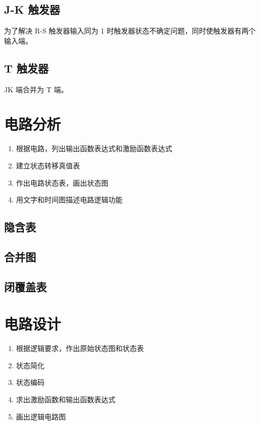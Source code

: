 \subsection{J-K 触发器}

为了解决 R-S 触发器输入同为 1 时触发器状态不确定问题，同时使触发器有两个输入端。

\subsection{T 触发器}

JK 端合并为 T 端。

\newpage

\section{电路分析}

\begin{enumerate}
    \item 根据电路，列出输出函数表达式和激励函数表达式
    \item 建立状态转移真值表
    \item 作出电路状态表，画出状态图
    \item 用文字和时间图描述电路逻辑功能
\end{enumerate}

\subsection{隐含表}
\subsection{合并图}
\subsection{闭覆盖表}

\section{电路设计}

\begin{enumerate}
    \item 根据逻辑要求，作出原始状态图和状态表
    \item 状态简化
    \item 状态编码
    \item 求出激励函数和输出函数表达式
    \item 画出逻辑电路图
\end{enumerate}

\newpage
